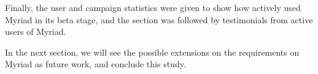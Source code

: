 Finally, the user and campaign statistics were given to show how actively used Myriad in its beta stage, and the section was followed by testimonials from active users of Myriad.
\vspace{1cm}

In the next section, we will see the possible extensions on the requirements on Myriad as future work, and conclude this study.

